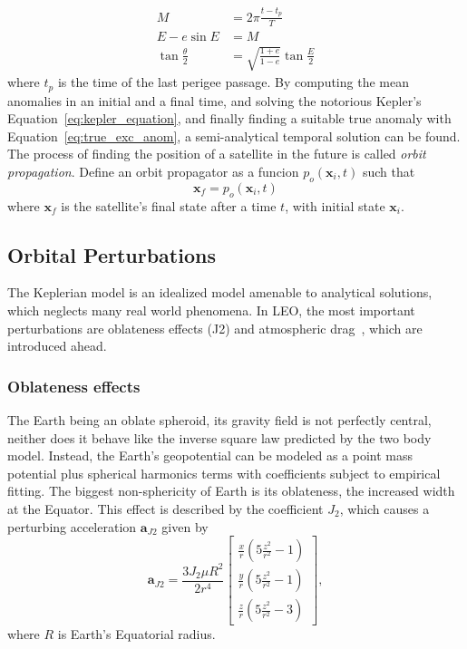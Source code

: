 \begin{align} 
        M &= 2\pi \frac{t - t_p}{T} \\
        E - e \sin{E} &= M \label{eq:kepler_equation}\\
        \tan{\frac{\theta}{2}} &= \sqrt{\frac{1+e}{1-e}} \tan{\frac{E}{2}} \label{eq:true_exc_anom}
\end{align}
where \(t_p\) is the time of the last perigee passage. By computing the mean anomalies in an initial and a final time, and solving the notorious Kepler's Equation~\eqref{eq:kepler_equation}, and finally finding a suitable true anomaly with Equation~\eqref{eq:true_exc_anom}, a semi-analytical temporal solution can be found. The process of finding the position of a satellite in the future is called \textit{orbit propagation}. Define an orbit propagator as a funcion \(p_o(\mathbf{x}_i, t)\) such that
\begin{equation} \label{eq:orbit_propagator}
    \mathbf{x}_f = p_o(\mathbf{x}_i, t)
\end{equation}
where \(\mathbf{x}_f\) is the satellite's final state after a time \(t\), with initial state \(\mathbf{x}_i\).

\subsection{Orbital Perturbations}

The Keplerian model is an idealized model amenable to analytical solutions, which neglects many real world phenomena. In LEO, the most important perturbations are oblateness effects (J2) and atmospheric drag~\cite{curtis2015orbital}, which are introduced ahead.

\subsubsection{Oblateness effects}

The Earth being an oblate spheroid, its gravity field is not perfectly central, neither does it behave like the inverse square law predicted by the two body model. Instead, the Earth's geopotential can be modeled as a point mass potential plus spherical harmonics terms with coefficients subject to empirical fitting. The biggest non-sphericity of Earth is its oblateness, the increased width at the Equator. This effect is described by the coefficient \(J_2\), which causes a perturbing acceleration \(\mathbf{a}_{J2}\) given by~\cite{curtis2015orbital}
\begin{equation}\label{eq:j2_acc}
    \mathbf{a}_{J2} = \frac{3 J_2 \mu R^2}{2 r^4} \begin{bmatrix}
        \frac{x}{r} \left(5 \frac{z^2}{r^2} - 1\right) \\
        \frac{y}{r} \left(5 \frac{z^2}{r^2} - 1\right) \\
        \frac{z}{r} \left(5 \frac{z^2}{r^2} - 3\right)
    \end{bmatrix},
\end{equation}
where \(R\) is Earth's Equatorial radius.

